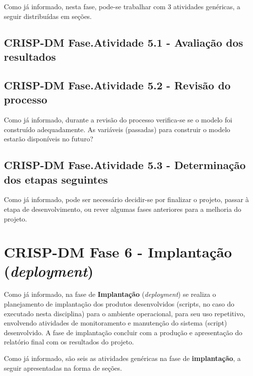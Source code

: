 \documentclass[]{article}
\begin{document}
Como já informado, nesta fase, pode-se trabalhar com 3 atividades
genéricas, a seguir distribuídas em seções.

\subsection{CRISP-DM Fase.Atividade 5.1 - Avaliação dos
resultados}\label{crisp-dm-fase.atividade-5.1---avaliacao-dos-resultados}

\subsection{CRISP-DM Fase.Atividade 5.2 - Revisão do
processo}\label{crisp-dm-fase.atividade-5.2---revisao-do-processo}

Como já informado, durante a revisão do processo verifica-se se o modelo
foi construído adequadamente. As variáveis (passadas) para construir o
modelo estarão disponíveis no futuro?

\subsection{CRISP-DM Fase.Atividade 5.3 - Determinação dos etapas
seguintes}\label{crisp-dm-fase.atividade-5.3---determinacao-dos-etapas-seguintes}

Como já informado, pode ser necessário decidir-se por finalizar o
projeto, passar à etapa de desenvolvimento, ou rever algumas fases
anteriores para a melhoria do projeto.

\section{\texorpdfstring{CRISP-DM Fase 6 - \textbf{Implantação}
(\emph{deployment})}{CRISP-DM Fase 6 - Implantação (deployment)}}\label{crisp-dm-fase-6---implantacao-deployment}

Como já informado, na fase de \textbf{Implantação} (\emph{deployment})
se realiza o planejamento de implantação dos produtos desenvolvidos
(scripts, no caso do executado nesta disciplina) para o ambiente
operacional, para seu uso repetitivo, envolvendo atividades de
monitoramento e manutenção do sistema (script) desenvolvido. A fase de
implantação concluir com a produção e apresentação do relatório final
com os resultados do projeto.

Como já informado, são seis as atividades genéricas na fase de
\textbf{implantação}, a seguir apresentadas na forma de seções.
\end{document}
